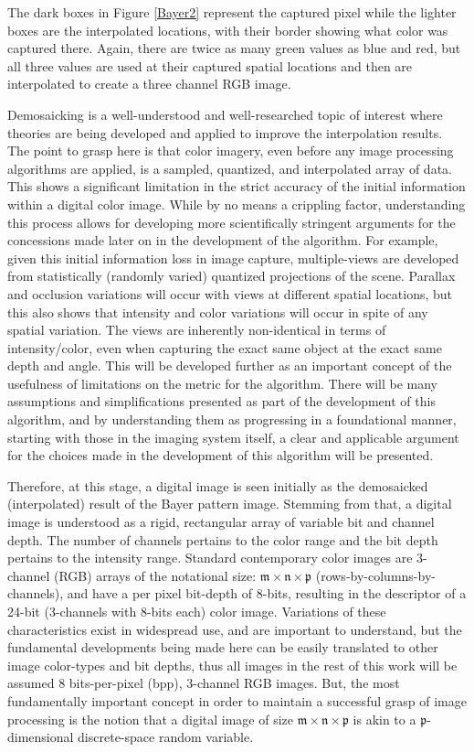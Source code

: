 The dark boxes in Figure \ref{Bayer2} represent the captured pixel while the lighter boxes are the interpolated locations, with their border showing what color was captured there. Again, there are twice as many green values as blue and red, but all three values are used at their captured spatial locations and then are interpolated to create a three channel RGB image.

Demosaicking is a well-understood and well-researched topic of interest where theories are being developed and applied to improve the interpolation results. The point to grasp here is that color imagery, even before any image processing algorithms are applied, is a sampled, quantized, and interpolated array of data. This shows a significant limitation in the strict accuracy of the initial information within a digital color image. While by no means a crippling factor, understanding this process allows for developing more scientifically stringent arguments for the concessions made later on in the development of the algorithm. For example, given this initial information loss in image capture, multiple-views are developed from statistically (randomly varied) quantized projections of the scene. Parallax and occlusion variations will occur with views at different spatial locations, but this also shows that intensity and color variations will occur in spite of any spatial variation. The views are inherently non-identical in terms of intensity/color, even when capturing the exact same object at the exact same depth and angle. This will be developed further as an important concept of the usefulness of limitations on the metric for the algorithm. There will be many assumptions and simplifications presented as part of the development of this algorithm, and by understanding them as progressing in a foundational manner, starting with those in the imaging system itself, a clear and applicable argument for the choices made in the development of this algorithm will be presented.

Therefore, at this stage, a digital image is seen initially as the demosaicked (interpolated) result of the Bayer pattern image. Stemming from that, a digital image is understood as a rigid, rectangular array of variable bit and channel depth. The number of channels pertains to the color range and the bit depth pertains to the intensity range. Standard contemporary color images are 3-channel (RGB) arrays of the notational size: $\mathfrak{m}\times\mathfrak{n}\times\mathfrak{p}$ (rows-by-columns-by-channels), and have a per pixel bit-depth of 8-bits, resulting in the descriptor of a 24-bit (3-channels with 8-bits each) color image. Variations of these characteristics exist in widespread use, and are important to understand, but the fundamental developments being made here can be easily translated to other image color-types and bit depths, thus all images in the rest of this work will be assumed 8 bits-per-pixel (bpp), 3-channel RGB images. But, the most fundamentally important concept in order to maintain a successful grasp of image processing is the notion that a digital image of size $\mathfrak{m} \times \mathfrak{n} \times \mathfrak{p}$ is akin to a $\mathfrak{p}$-dimensional discrete-space random variable.

